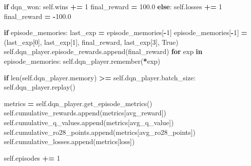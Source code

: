\documentclass[12pt]{article}
\newenvironment{Shaded}{\begin{snugshade}}{\end{snugshade}}
\newcommand{\BuiltInTok}[1]{#1}
\newcommand{\ControlFlowTok}[1]{\textcolor[rgb]{0.13,0.29,0.53}{\textbf{#1}}}
\newcommand{\DecValTok}[1]{\textcolor[rgb]{0.00,0.00,0.81}{#1}}
\newcommand{\FloatTok}[1]{\textcolor[rgb]{0.00,0.00,0.81}{#1}}
\newcommand{\KeywordTok}[1]{\textcolor[rgb]{0.13,0.29,0.53}{\textbf{#1}}}
\newcommand{\NormalTok}[1]{#1}
\newcommand{\OperatorTok}[1]{\textcolor[rgb]{0.81,0.36,0.00}{\textbf{#1}}}
\newcommand{\StringTok}[1]{\textcolor[rgb]{0.31,0.60,0.02}{#1}}
\newcommand{\VariableTok}[1]{\textcolor[rgb]{0.00,0.00,0.00}{#1}}
\begin{document}
\begin{thesis}
\begin{Shaded}
\begin{Highlighting}[]
        \ControlFlowTok{if}\NormalTok{ dqn\_won:}
            \VariableTok{self}\NormalTok{.wins }\OperatorTok{+=} \DecValTok{1}
\NormalTok{            final\_reward }\OperatorTok{=} \FloatTok{100.0}
        \ControlFlowTok{else}\NormalTok{:}
            \VariableTok{self}\NormalTok{.losses }\OperatorTok{+=} \DecValTok{1}
\NormalTok{            final\_reward }\OperatorTok{=} \OperatorTok{{-}}\FloatTok{100.0}
        
        \ControlFlowTok{if}\NormalTok{ episode\_memories:}
\NormalTok{            last\_exp }\OperatorTok{=}\NormalTok{ episode\_memories[}\OperatorTok{{-}}\DecValTok{1}\NormalTok{]}
\NormalTok{            episode\_memories[}\OperatorTok{{-}}\DecValTok{1}\NormalTok{] }\OperatorTok{=} 
\NormalTok{                (last\_exp[}\DecValTok{0}\NormalTok{], last\_exp[}\DecValTok{1}\NormalTok{], final\_reward, last\_exp[}\DecValTok{3}\NormalTok{], }\VariableTok{True}\NormalTok{)}
            \VariableTok{self}\NormalTok{.dqn\_player.episode\_rewards.append(final\_reward)}
        \ControlFlowTok{for}\NormalTok{ exp }\KeywordTok{in}\NormalTok{ episode\_memories:}
            \VariableTok{self}\NormalTok{.dqn\_player.remember(}\OperatorTok{*}\NormalTok{exp)}
        
        \ControlFlowTok{if} \BuiltInTok{len}\NormalTok{(}\VariableTok{self}\NormalTok{.dqn\_player.memory) }\OperatorTok{\textgreater{}=} \VariableTok{self}\NormalTok{.dqn\_player.batch\_size:}
            \VariableTok{self}\NormalTok{.dqn\_player.replay()}
        
\NormalTok{        metrics }\OperatorTok{=} \VariableTok{self}\NormalTok{.dqn\_player.get\_episode\_metrics()}
        \VariableTok{self}\NormalTok{.cumulative\_rewards.append(metrics[}\StringTok{\textquotesingle{}avg\_reward\textquotesingle{}}\NormalTok{])}
        \VariableTok{self}\NormalTok{.cumulative\_q\_values.append(metrics[}\StringTok{\textquotesingle{}avg\_q\_value\textquotesingle{}}\NormalTok{])}
        \VariableTok{self}\NormalTok{.cumulative\_ro28\_points.append(metrics[}\StringTok{\textquotesingle{}avg\_ro28\_points\textquotesingle{}}\NormalTok{])}
        \VariableTok{self}\NormalTok{.cumulative\_losses.append(metrics[}\StringTok{\textquotesingle{}loss\textquotesingle{}}\NormalTok{])}

        \VariableTok{self}\NormalTok{.episodes }\OperatorTok{+=} \DecValTok{1}
        

\end{Highlighting}
\end{Shaded}
\end{thesis}
\end{document}
